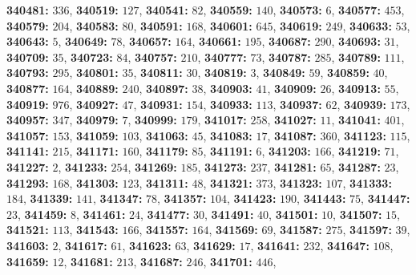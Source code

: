 \textsf{\bfseries 340481:} $336$, \textsf{\bfseries 340519:} $127$, \textsf{\bfseries 340541:} $82$, \textsf{\bfseries 340559:} $140$, \textsf{\bfseries 340573:} $6$, \textsf{\bfseries 340577:} $453$, \textsf{\bfseries 340579:} $204$, \textsf{\bfseries 340583:} $80$, \textsf{\bfseries 340591:} $168$, \textsf{\bfseries 340601:} $645$, \textsf{\bfseries 340619:} $249$, \textsf{\bfseries 340633:} $53$, \textsf{\bfseries 340643:} $5$, \textsf{\bfseries 340649:} $78$, \textsf{\bfseries 340657:} $164$, \textsf{\bfseries 340661:} $195$, \textsf{\bfseries 340687:} $290$, \textsf{\bfseries 340693:} $31$, \textsf{\bfseries 340709:} $35$, \textsf{\bfseries 340723:} $84$, \textsf{\bfseries 340757:} $210$, \textsf{\bfseries 340777:} $73$, \textsf{\bfseries 340787:} $285$, \textsf{\bfseries 340789:} $111$, \textsf{\bfseries 340793:} $295$, \textsf{\bfseries 340801:} $35$, \textsf{\bfseries 340811:} $30$, \textsf{\bfseries 340819:} $3$, \textsf{\bfseries 340849:} $59$, \textsf{\bfseries 340859:} $40$, \textsf{\bfseries 340877:} $164$, \textsf{\bfseries 340889:} $240$, \textsf{\bfseries 340897:} $38$, \textsf{\bfseries 340903:} $41$, \textsf{\bfseries 340909:} $26$, \textsf{\bfseries 340913:} $55$, \textsf{\bfseries 340919:} $976$, \textsf{\bfseries 340927:} $47$, \textsf{\bfseries 340931:} $154$, \textsf{\bfseries 340933:} $113$, \textsf{\bfseries 340937:} $62$, \textsf{\bfseries 340939:} $173$, \textsf{\bfseries 340957:} $347$, \textsf{\bfseries 340979:} $7$, \textsf{\bfseries 340999:} $179$, \textsf{\bfseries 341017:} $258$, \textsf{\bfseries 341027:} $11$, \textsf{\bfseries 341041:} $401$, \textsf{\bfseries 341057:} $153$, \textsf{\bfseries 341059:} $103$, \textsf{\bfseries 341063:} $45$, \textsf{\bfseries 341083:} $17$, \textsf{\bfseries 341087:} $360$, \textsf{\bfseries 341123:} $115$, \textsf{\bfseries 341141:} $215$, \textsf{\bfseries 341171:} $160$, \textsf{\bfseries 341179:} $85$, \textsf{\bfseries 341191:} $6$, \textsf{\bfseries 341203:} $166$, \textsf{\bfseries 341219:} $71$, \textsf{\bfseries 341227:} $2$, \textsf{\bfseries 341233:} $254$, \textsf{\bfseries 341269:} $185$, \textsf{\bfseries 341273:} $237$, \textsf{\bfseries 341281:} $65$, \textsf{\bfseries 341287:} $23$, \textsf{\bfseries 341293:} $168$, \textsf{\bfseries 341303:} $123$, \textsf{\bfseries 341311:} $48$, \textsf{\bfseries 341321:} $373$, \textsf{\bfseries 341323:} $107$, \textsf{\bfseries 341333:} $184$, \textsf{\bfseries 341339:} $141$, \textsf{\bfseries 341347:} $78$, \textsf{\bfseries 341357:} $104$, \textsf{\bfseries 341423:} $190$, \textsf{\bfseries 341443:} $75$, \textsf{\bfseries 341447:} $23$, \textsf{\bfseries 341459:} $8$, \textsf{\bfseries 341461:} $24$, \textsf{\bfseries 341477:} $30$, \textsf{\bfseries 341491:} $40$, \textsf{\bfseries 341501:} $10$, \textsf{\bfseries 341507:} $15$, \textsf{\bfseries 341521:} $113$, \textsf{\bfseries 341543:} $166$, \textsf{\bfseries 341557:} $164$, \textsf{\bfseries 341569:} $69$, \textsf{\bfseries 341587:} $275$, \textsf{\bfseries 341597:} $39$, \textsf{\bfseries 341603:} $2$, \textsf{\bfseries 341617:} $61$, \textsf{\bfseries 341623:} $63$, \textsf{\bfseries 341629:} $17$, \textsf{\bfseries 341641:} $232$, \textsf{\bfseries 341647:} $108$, \textsf{\bfseries 341659:} $12$, \textsf{\bfseries 341681:} $213$, \textsf{\bfseries 341687:} $246$, \textsf{\bfseries 341701:} $446$, 
